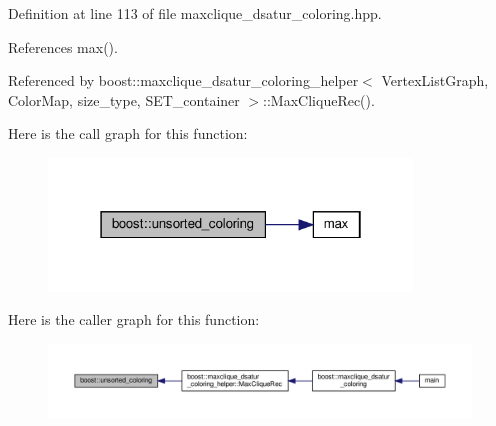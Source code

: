 Definition at line 113 of file maxclique\+\_\+dsatur\+\_\+coloring.\+hpp.



References max().



Referenced by boost\+::maxclique\+\_\+dsatur\+\_\+coloring\+\_\+helper$<$ Vertex\+List\+Graph, Color\+Map, size\+\_\+type, S\+E\+T\+\_\+container $>$\+::\+Max\+Clique\+Rec().

Here is the call graph for this function\+:
\nopagebreak
\begin{figure}[H]
\begin{center}
\leavevmode
\includegraphics[width=274pt]{d4/da9/namespaceboost_aa5d4da27fc701c66bcda76bd3735eb05_cgraph}
\end{center}
\end{figure}
Here is the caller graph for this function\+:
\nopagebreak
\begin{figure}[H]
\begin{center}
\leavevmode
\includegraphics[width=350pt]{d4/da9/namespaceboost_aa5d4da27fc701c66bcda76bd3735eb05_icgraph}
\end{center}
\end{figure}
